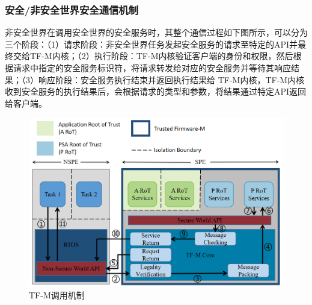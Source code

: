 \documentclass[12pt,a4paper]{ctexart}
\begin{document}
\subsubsection{安全/非安全世界安全通信机制}
非安全世界在调用安全世界的安全服务时，其整个通信过程如下图所示，可以分为三个阶段：（1）请求阶段：非安全世界任务发起安全服务的请求至特定的API并最终交给TF-M内核；（2）执行阶段：TF-M内核验证客户端的身份和权限，然后根据请求中指定的安全服务标识符，将请求转发给对应的安全服务并等待其响应结果；（3）响应阶段：安全服务执行结束并返回执行结果给 TF-M内核，TF-M内核收到安全服务的执行结果后，会根据请求的类型和参数，将结果通过特定API返回给客户端。
\begin{figure}
    \centering
    \includegraphics[scale=0.27]{graph/TF-M Secure communication processes.png}
    \caption{TF-M调用机制}
\end{figure}
\end{document}
